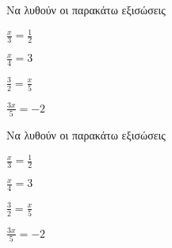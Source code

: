 Να λυθούν οι παρακάτω εξισώσεις
\begin{alist}
\item $ \frac{x}{3}=\frac{1}{2} $
\item $ \frac{x}{4}=3 $
\item $ \frac{3}{2}=\frac{x}{5} $
\item $ \frac{3x}{5}=-2 $
\end{alist}
Να λυθούν οι παρακάτω εξισώσεις
\begin{alist}
\item $ \frac{x}{3}=\frac{1}{2} $
\item $ \frac{x}{4}=3 $
\item $ \frac{3}{2}=\frac{x}{5} $
\item $ \frac{3x}{5}=-2 $
\end{alist}

